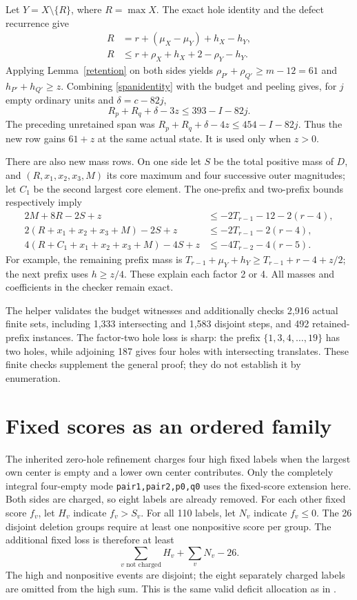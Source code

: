 \documentclass[11pt,a4paper]{article}
\begin{document}
Let $Y=X\setminus\{R\}$, where $R=\max X$.
The exact hole identity and the defect recurrence give
\begin{align}
 R&=r+(\mu_X-\mu_Y)+h_X-h_Y,\\
 R&\le r+\rho_X+h_X+2-\rho_Y-h_Y.\label{spanidentity}
\end{align}
Applying Lemma~\ref{retention} on both sides yields
$\rho_{P'}+\rho_{Q'}\ge m-12=61$ and
$h_{P'}+h_{Q'}\ge z$. Combining \eqref{spanidentity} with the
budget and peeling gives, for $j$ empty ordinary units and
$\delta=c-82j$,
\begin{equation}\label{newspan}
 R_p+R_q+\delta-3z\le393-I-82j.
\end{equation}
The preceding unretained span was
$R_p+R_q+\delta-4z\le454-I-82j$.
Thus the new row gains $61+z$ at the same actual state.
It is used only when $z>0$.

There are also new mass rows. On one side let
$S$ be the total positive mass of $D$, and
$(R,x_1,x_2,x_3,M)$ its core maximum and four successive outer
magnitudes; let $C_1$ be the second largest core element.
The one-prefix and two-prefix bounds respectively imply
\begin{align}
 2M+8R-2S+z&\le-2T_{r-1}-12-2(r-4),\\
 2(R+x_1+x_2+x_3+M)-2S+z&\le-2T_{r-1}-2(r-4),\\
 4(R+C_1+x_1+x_2+x_3+M)-4S+z
   &\le-4T_{r-2}-4(r-5).\label{secondmass}
\end{align}
For example, the remaining prefix mass is
$T_{r-1}+\mu_Y+h_Y\ge T_{r-1}+r-4+z/2$;
the next prefix uses $h\ge z/4$. These explain each factor 2 or 4.
All masses and coefficients in the checker remain exact.

The helper  validates the budget
witnesses and additionally checks 2,916 actual finite sets, including
1,333 intersecting and 1,583 disjoint steps, and 492 retained-prefix
instances. The factor-two hole loss is sharp: the prefix
$\{1,3,4,\ldots,19\}$ has two holes, while adjoining 187 gives four
holes with intersecting translates. These finite checks supplement the
general proof; they do not establish it by enumeration.

\section{Fixed scores as an ordered family}
The inherited zero-hole refinement charges four high fixed labels when
the largest own center is empty and a lower own center contributes.
Only the completely integral four-empty mode
\texttt{pair1,pair2,p0,q0} uses the fixed-score extension here.
Both sides are charged, so eight labels are already removed.
For each other fixed score $f_v$, let $H_v$ indicate $f_v>S_v$.
For all 110 labels, let $N_v$ indicate $f_v\le0$.
The 26 disjoint deletion groups require at least one nonpositive score
per group. The additional fixed loss is therefore at least
\[
 \sum_{v\text{ not charged}}H_v+\sum_vN_v-26.
\]
The high and nonpositive events are disjoint; the eight separately
charged labels are omitted from the high sum. This is the same valid
deficit allocation as in \cite{previous}.
\end{document}

